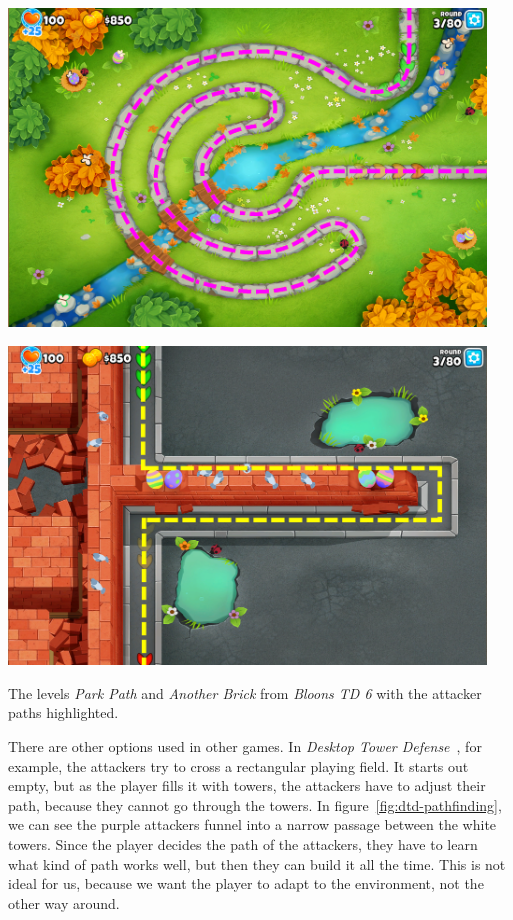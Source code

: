 \begin{center}
    \captionsetup{type=figure}
    \begin{minipage}{.5\textwidth}
        \centering
        \includegraphics[width=0.95\textwidth]{img/Bloons-TD6-Park-Path-Highlighted.png}
    \end{minipage}%
    \begin{minipage}{.5\textwidth}
        \centering
        \includegraphics[width=0.95\textwidth]{img/Bloons-TD6-Another-Brick-Highlighted.png}
    \end{minipage}
    \caption{The levels \emph{Park Path} and \emph{Another Brick} from \emph{Bloons TD 6} with the attacker paths highlighted.}
    \label{fig:btd6-maps}
\end{center}

There are other options used in other games.
In \emph{Desktop Tower Defense}~\cite{DTDWiki}, for example, the attackers try to cross a rectangular playing field.
It starts out empty, but as the player fills it with towers, the attackers have to adjust their path, because they cannot go through the towers.
In figure~\ref{fig:dtd-pathfinding}, we can see the purple attackers funnel into a narrow passage between the white towers.
Since the player decides the path of the attackers, they have to learn what kind of path works well, but then they can build it all the time.
This is not ideal for us, because we want the player to adapt to the environment, not the other way around.

